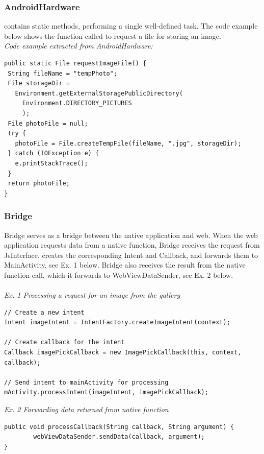 \subsubsection{AndroidHardware} contains static methods, performing a single well-defined task. The code example below shows the function called to request a file for storing an image.
	\\
	\emph{Code example extracted from AndroidHardware:}
\begin{lstlisting}
public static File requestImageFile() {
 String fileName = "tempPhoto";
 File storageDir = 
   Environment.getExternalStoragePublicDirectory(
     Environment.DIRECTORY_PICTURES
     );
 File photoFile = null;
 try {
   photoFile = File.createTempFile(fileName, ".jpg", storageDir);
 } catch (IOException e) {
   e.printStackTrace();
 }
 return photoFile;
}
\end{lstlisting}
	
\subsubsection{Bridge} 
Bridge serves as a bridge between the native application and web. When the web application requests data from a native function, Bridge receives the request from JsInterface, creates the corresponding Intent and Callback, and forwards them to MainActivity, see Ex. 1 below. Bridge also receives the result from the native function call, which it forwards to WebViewDataSender, see Ex. 2 below.
\\\\
\emph{Ex. 1 Processing a request for an image from the gallery}
\begin{lstlisting}
// Create a new intent
Intent imageIntent = IntentFactory.createImageIntent(context);

// Create callback for the intent
Callback imagePickCallback = new ImagePickCallback(this, context, callback);

// Send intent to mainActivity for processing
mActivity.processIntent(imageIntent, imagePickCallback);
\end{lstlisting}

\emph{Ex. 2 Forwarding data returned from native function}
\begin{lstlisting}
public void processCallback(String callback, String argument) {
        webViewDataSender.sendData(callback, argument);
}
\end{lstlisting}
	
